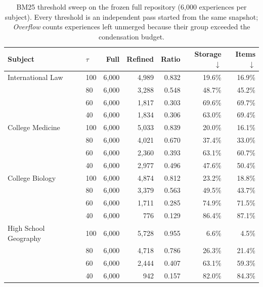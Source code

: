 \begin{table}[t]
\centering
\caption{BM25 threshold sweep on the frozen full repository (6{,}000 experiences per subject). Every threshold is an independent pass started from the same snapshot; \emph{Overflow} counts experiences left unmerged because their group exceeded the condensation budget.}
\label{tab:refinement_sweep}
\small
\begin{tabular}{llrrrrr}
\toprule
Subject & $\tau$ & Full & Refined & Ratio & Storage$\downarrow$ & Items$\downarrow$ \\
\midrule
International Law & 100 & 6,000 & 4,989 & 0.832 & 19.6\% & 16.9\% \\
 & 80 & 6,000 & 3,288 & 0.548 & 48.7\% & 45.2\% \\
 & 60 & 6,000 & 1,817 & 0.303 & 69.6\% & 69.7\% \\
 & 40 & 6,000 & 1,834 & 0.306 & 63.0\% & 69.4\% \\
\midrule
College Medicine & 100 & 6,000 & 5,033 & 0.839 & 20.0\% & 16.1\% \\
 & 80 & 6,000 & 4,021 & 0.670 & 37.4\% & 33.0\% \\
 & 60 & 6,000 & 2,360 & 0.393 & 63.1\% & 60.7\% \\
 & 40 & 6,000 & 2,977 & 0.496 & 47.6\% & 50.4\% \\
\midrule
College Biology & 100 & 6,000 & 4,874 & 0.812 & 23.2\% & 18.8\% \\
 & 80 & 6,000 & 3,379 & 0.563 & 49.5\% & 43.7\% \\
 & 60 & 6,000 & 1,711 & 0.285 & 74.9\% & 71.5\% \\
 & 40 & 6,000 & 776 & 0.129 & 86.4\% & 87.1\% \\
\midrule
High School Geography & 100 & 6,000 & 5,728 & 0.955 & 6.6\% & 4.5\% \\
 & 80 & 6,000 & 4,718 & 0.786 & 26.3\% & 21.4\% \\
 & 60 & 6,000 & 2,444 & 0.407 & 63.1\% & 59.3\% \\
 & 40 & 6,000 & 942 & 0.157 & 82.0\% & 84.3\% \\
\bottomrule
\end{tabular}
\end{table}
